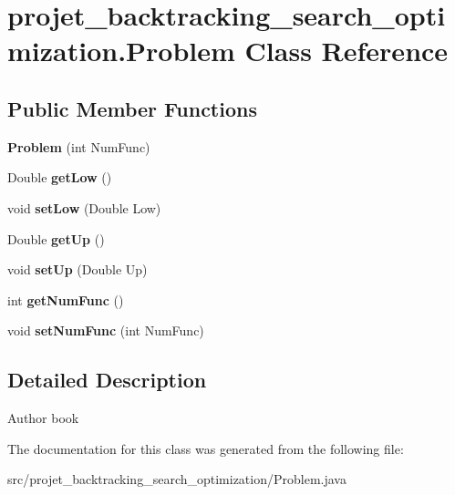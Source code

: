 \hypertarget{classprojet__backtracking__search__optimization_1_1_problem}{}\section{projet\+\_\+backtracking\+\_\+search\+\_\+optimization.\+Problem Class Reference}
\label{classprojet__backtracking__search__optimization_1_1_problem}
\subsection*{Public Member Functions}
\begin{DoxyCompactItemize}
\item 
\mbox{\label{classprojet__backtracking__search__optimization_1_1_problem_a0359afe89ffc0587a72422c82019e717}} 
{\bfseries Problem} (int Num\+Func)
\item 
\mbox{\label{classprojet__backtracking__search__optimization_1_1_problem_af700e294a212632814b45e9570d64000}} 
Double {\bfseries get\+Low} ()
\item 
\mbox{\label{classprojet__backtracking__search__optimization_1_1_problem_a97af64def8d21a9406e18cd55f90dc5f}} 
void {\bfseries set\+Low} (Double Low)
\item 
\mbox{\label{classprojet__backtracking__search__optimization_1_1_problem_ad5c3e417f1536690eb41fd0d1a6ea7e2}} 
Double {\bfseries get\+Up} ()
\item 
\mbox{\label{classprojet__backtracking__search__optimization_1_1_problem_a2ddd7e88e88efe870ac7977a8df4f1eb}} 
void {\bfseries set\+Up} (Double Up)
\item 
\mbox{\label{classprojet__backtracking__search__optimization_1_1_problem_abac3fcd021256f637eb0b82dc2b1b914}} 
int {\bfseries get\+Num\+Func} ()
\item 
\mbox{\label{classprojet__backtracking__search__optimization_1_1_problem_a9a066ac53ed5cc2366207568cd311a43}} 
void {\bfseries set\+Num\+Func} (int Num\+Func)
\end{DoxyCompactItemize}


\subsection{Detailed Description}
\begin{DoxyAuthor}{Author}
book 
\end{DoxyAuthor}


The documentation for this class was generated from the following file\+:\begin{DoxyCompactItemize}
\item 
src/projet\+\_\+backtracking\+\_\+search\+\_\+optimization/Problem.\+java\end{DoxyCompactItemize}
